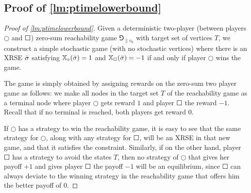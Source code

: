 \subsection{Proof of \cref{lm:ptimelowerbound}}\label{app:ptimelowerbound}
\ptimelowerbound*
\begin{proof}[Proof of \cref{lm:ptimelowerbound}]
        Given a deterministic two-player (between players $\Circle$ and $\Square$) zero-sum reachability game $\Game_{\|v_0}$ with target set of vertices $T$, we construct a simple stochastic game (with no stochastic vertices) where there is an XRSE ${\bar{\sigma}}$ satisfying $\mathbb{X}_\circ({\bar{\sigma}}) = 1$ and $\mathbb{X}_\Box({\bar{\sigma}}) = -1$ if and only if player $\Circle$ wins the game.  

        The game is simply obtained by assigning rewards on the zero-sum two player game as follows: we make all nodes in the target set $T$ of the reachability game as a terminal node where player $\Circle$ gets reward $1$ and player $\Square$ the reward $-1$. Recall that if no terminal is reached, both players get reward $0$.  

        If $\Circle$ has a strategy to win the reachability game, it is easy to see that the same strategy for $\Circle$, along with any strategy for $\Square$, will be an XRSE in that new game, and that it satisfies the constraint.
        Similarly, if on the other hand, player $\Square$ has a strategy to avoid the states $T$, then no strategy of $\Circle$ that gives her payoff $+1$ and gives player $\Square$ the payoff $-1$ will be an equilibrium, since $\Square$ can always deviate to the winning strategy in the reachability game that offers him the better payoff of $0$.
\end{proof}

